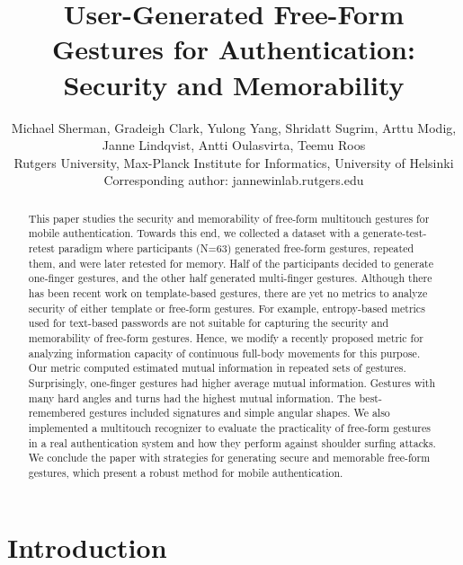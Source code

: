 \documentclass{sig-alternate-10pt}
\begin{document}
\title{User-Generated Free-Form Gestures for Authentication: Security and Memorability}

\author{
  \alignauthor Michael Sherman, Gradeigh Clark, Yulong Yang, Shridatt Sugrim, Arttu Modig, Janne Lindqvist, Antti Oulasvirta, Teemu Roos \\
  Rutgers University, Max-Planck Institute for Informatics, University of Helsinki \\ Corresponding author: jannewinlab.rutgers.edu \\
  }

\maketitle

\begin{abstract}
This paper studies the security and memorability of free-form multitouch gestures for mobile authentication. Towards this end, we collected a dataset with a generate-test-retest paradigm where participants (N=63) generated free-form gestures, repeated them, and were later retested for memory. Half of the participants decided to generate one-finger gestures, and the other half generated multi-finger gestures. Although there has been recent work on template-based gestures, there are yet no metrics to analyze security of either template or free-form gestures. For example, entropy-based metrics used for text-based passwords are not suitable for capturing the security and memorability of free-form gestures. Hence, we modify a recently proposed metric for analyzing information capacity of continuous full-body movements for this purpose.  Our metric computed estimated mutual information in repeated sets of gestures. Surprisingly, one-finger gestures had higher average mutual information. Gestures with many hard angles and turns had the highest mutual information. The best-remembered gestures included signatures and simple angular shapes.  We also implemented a multitouch recognizer to evaluate the practicality of free-form gestures in a real authentication system and how they perform against shoulder surfing attacks. We conclude the paper with strategies for generating secure and memorable free-form gestures, which present a robust method for mobile authentication.
\end{abstract}




\section{Introduction}
\end{document}

